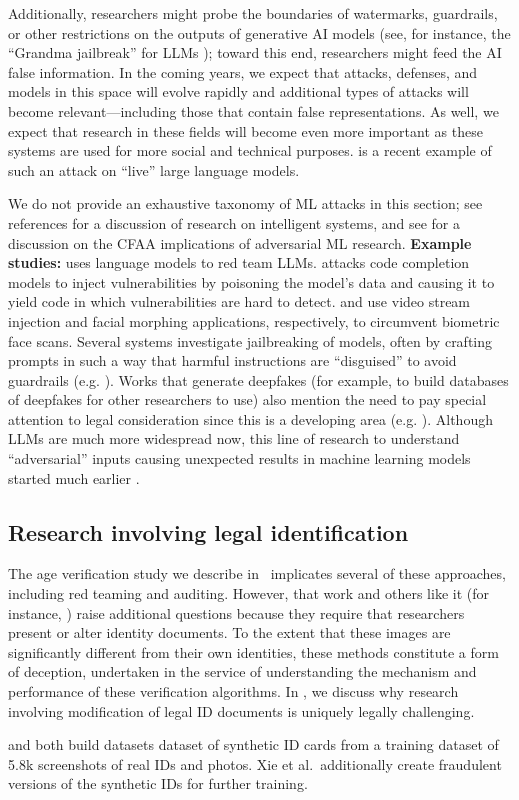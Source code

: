 Additionally, researchers might probe the boundaries of watermarks, guardrails, or other restrictions on the outputs of generative AI models (see, for instance, the ``Grandma jailbreak'' for LLMs \cite{zhang2023jailbreak}); toward this end, researchers might feed the AI false information. In the coming years, we expect that attacks, defenses, and models in this space will evolve rapidly and additional types of attacks will become relevant---including those that contain false representations. As well, we expect that research in these fields will become even more important as these systems are used for more social and technical purposes. \cite{carliniAreAlignedNeural} is a recent example of such an attack on ``live'' large language models.

We do not provide an exhaustive taxonomy of ML attacks in this section; see references for a discussion of research on intelligent systems, and see \cite{kumarLegalRisksAdversarial} for a discussion on the CFAA implications of adversarial ML research.
\textbf{Example studies:}
\cite{perez2022red} uses language models to red team LLMs.
\cite{yanLLMAssistedEasyTriggerBackdoor} attacks code completion models to inject vulnerabilities by poisoning the model's data and causing it to yield code in which vulnerabilities are hard to detect. \cite{carta2022video} and \cite{scherhag2017biometric} use video stream injection and facial morphing applications, respectively, to circumvent biometric face scans. 
Several systems investigate jailbreaking of models, often by crafting prompts in such a way that harmful instructions are ``disguised'' to avoid guardrails (e.g. \cite{carliniAreAlignedNeural,liuMakingThemAsk2024,yangSneakyPromptJailbreakingTextimage2024,yuDontListenMe2024}).
Works that generate deepfakes (for example, to build databases of deepfakes for other researchers to use) also mention the need to pay special attention to legal consideration since this is a developing area (e.g. \cite{mengAVAInconspicuousAttribute2024,laytonSokGoodBad}).
Although LLMs are much more widespread now, this line of research to understand ``adversarial'' inputs causing unexpected results in machine learning models started much earlier \cite{huangAdversarialMachineLearning,kurakinAdversarialMachineLearning2017}.

\subsection{Research involving legal identification}
\label{sec:id_work}
\label{sec:ids}
The age verification study we describe in~ implicates several of these approaches, including red teaming and auditing.
However, that work and others like it (for instance, \cite{di2022revisiting, di2019personal}) raise additional questions because they require that researchers present or alter identity documents.
To the extent that these images are significantly different from their own identities, these methods constitute a form of deception, undertaken in the service of understanding the mechanism and performance of these verification algorithms. In , we discuss why research involving modification of legal ID documents is uniquely legally challenging.

\cite{guanIDNetNovelDataset2024} and \cite{lerougeDocXPand25kLargeDiverse2024} both build datasets dataset of synthetic ID cards from a training dataset of 5.8k screenshots of real IDs and photos. Xie et al.\ additionally create fraudulent versions of the synthetic IDs for further training.